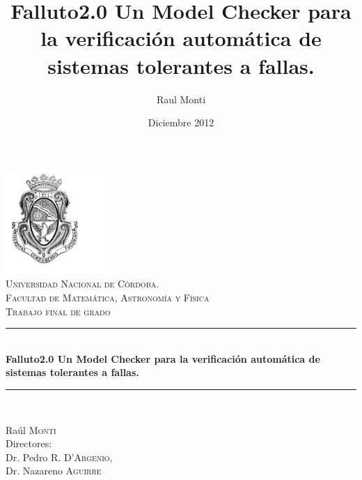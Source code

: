 \documentclass[titlepage, 12pt]{book}
\title{Falluto2.0 Un Model Checker para la verificaci\'on autom\'atica de sistemas tolerantes a fallas.}
\author{Raul Monti}
\date{Diciembre 2012}
\newcommand{\HRule}{\rule{\linewidth}{0.5mm}}
\begin{document}

%

\begin{titlepage}
\begin{center}

\includegraphics[width=0.30\textwidth]{./Imagenes/logo}~\\[0.5cm]

\textsc{\Large Universidad Nacional de C\'ordoba.\\ Facultad de Matem\'atica, Astronom\'ia y F\'isica}\\[0.5cm]

\textsc{\large Trabajo final de grado}\\

\HRule \\[0.4cm]
{ \huge \bfseries Falluto2.0 Un Model Checker para la verificaci\'on autom\'atica de sistemas tolerantes a fallas.}\\
\HRule \\[1.0cm]



\hspace{0.5\textwidth}
\begin{minipage}{0.45\textwidth}
\begin{flushleft}
{\large
Ra\'ul \textsc{Monti}\\
Directores:\\
Dr. Pedro R. \textsc{D'Argenio},\\
Dr. Nazareno \textsc{Aguirre}
}
\end{flushleft}
\end{minipage}


\end{center}
\end{titlepage}
\end{document}
